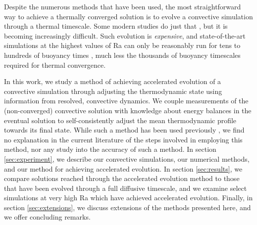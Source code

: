 \documentclass[aps, pre, onecolumn, nofootinbib, notitlepage, groupedaddress, amsfonts, amssymb, amsmath, longbibliography]{revtex4-1}
\begin{document}
Despite the numerous methods that have been used,
the most straightforward way to achieve a thermally converged solution
is to evolve a convective simulation through a thermal timescale. Some modern
studies do just that \cite{featherstone&hindman2016}, but it is becoming
increasingly difficult. Such evolution is
\emph{expensive}, and state-of-the-art simulations at the highest values of Ra
can only be reasonably run
for tens to hundreds of buoyancy times \cite{stevens&all2011}, much less the
thousands of buoyancy timescales required for thermal convergence.

In this work, we study a method of achieving accelerated evolution of a
convective simulation through adjusting the thermodynamic state using information 
from resolved, convective dynamics. We couple measurements of the (non-converged)
convective solution with knowledge about energy balances in the eventual solution
to self-consistently adjust the mean thermodynamic profile towards its final state. 
While such a method has been used previously \cite{hurlburt&all1986}, 
we find no explanation in the current literature of the steps involved in employing
this method, nor any study into the accuracy of such a method.
In section \ref{sec:experiment}, we describe our convective simulations, our
numerical methods, and our method for achieving accelerated evolution. In
section \ref{sec:results}, we compare solutions reached through the accelerated evolution
method to those that have been evolved through a full diffusive timescale, and we
examine select simulations at very high Ra which have achieved accelerated evolution. Finally,
in section \ref{sec:extensions}, we discuss extensions of the methods presented here,
and we offer concluding remarks.


\end{document}
